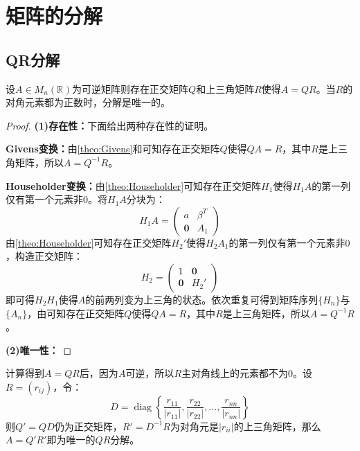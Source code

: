 \section{矩阵的分解}

\subsection{QR分解}
\begin{theorem}\label{theo:QR}
	设$A\in M_{n}(\mathbb{R}^{})$为可逆矩阵则存在正交矩阵$Q$和上三角矩阵$R$使得$A=QR$。当$R$的对角元素都为正数时，分解是唯一的。
\end{theorem}
\begin{proof}
	\textbf{(1)存在性：}下面给出两种存在性的证明。\par
	\textbf{Givens变换：}由\cref{theo:Givens}和可知存在正交矩阵$Q$使得$QA=R$，其中$R$是上三角矩阵，所以$A=Q^{-1}R$。\par
	\textbf{Householder变换：}由\cref{theo:Householder}可知存在正交矩阵$H_1$使得$H_1A$的第一列仅有第一个元素非$0$。将$H_1A$分块为：
	\begin{equation*}
		H_1A=
		\begin{pmatrix}
			a & \beta^T \\
			\mathbf{0} & A_1
		\end{pmatrix}
	\end{equation*}
	由\cref{theo:Householder}可知存在正交矩阵$H_2'$使得$H_2A_1$的第一列仅有第一个元素非$0$，构造正交矩阵：
	\begin{equation*}
		H_2=
		\begin{pmatrix}
			1 & \mathbf{0} \\
			\mathbf{0} & H_2'
		\end{pmatrix}
	\end{equation*}
	即可得$H_2H_1$使得$A$的前两列变为上三角的状态。依次重复可得到矩阵序列$\{H_n\}$与$\{A_n\}$，由可知存在正交矩阵$Q$使得$QA=R$，其中$R$是上三角矩阵，所以$A=Q^{-1}R$。\par
	\textbf{(2)唯一性：}
\end{proof}
\begin{note}
	计算得到$A=QR$后，因为$A$可逆，所以$R$主对角线上的元素都不为$0$。设$R=(r_{ij})$，令：
	\begin{equation*}
		D=\operatorname{diag}\left\{\frac{r_{11}}{|r_{11}|},\frac{r_{22}}{|r_{22}|},\dots,\frac{r_{nn}}{|r_{nn}|}\right\}
	\end{equation*}
	则$Q'=QD$仍为正交矩阵，$R'=D^{-1}R$为对角元是$|r_{ii}|$的上三角矩阵，那么$A=Q'R'$即为唯一的$QR$分解。
\end{note}

